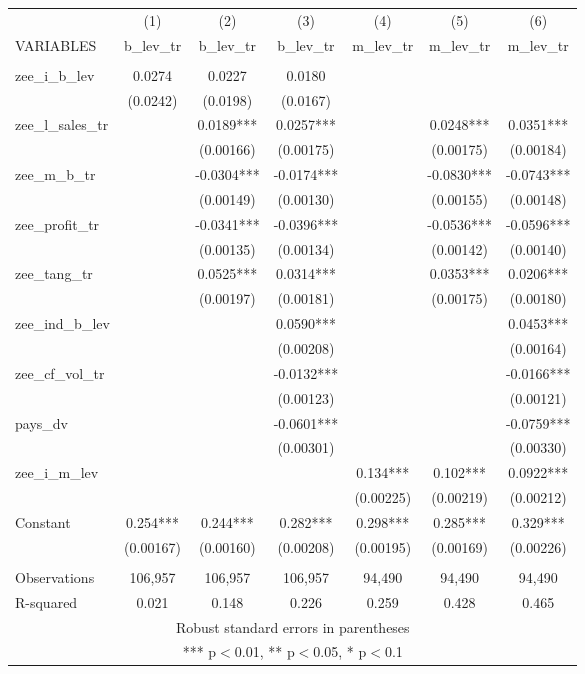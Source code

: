 \begin{tabular}{lcccccc} \hline
 & (1) & (2) & (3) & (4) & (5) & (6) \\
VARIABLES & b\_lev\_tr & b\_lev\_tr & b\_lev\_tr & m\_lev\_tr & m\_lev\_tr & m\_lev\_tr \\ \hline
 &  &  &  &  &  &  \\
zee\_i\_b\_lev & 0.0274 & 0.0227 & 0.0180 &  &  &  \\
 & (0.0242) & (0.0198) & (0.0167) &  &  &  \\
zee\_l\_sales\_tr &  & 0.0189*** & 0.0257*** &  & 0.0248*** & 0.0351*** \\
 &  & (0.00166) & (0.00175) &  & (0.00175) & (0.00184) \\
zee\_m\_b\_tr &  & -0.0304*** & -0.0174*** &  & -0.0830*** & -0.0743*** \\
 &  & (0.00149) & (0.00130) &  & (0.00155) & (0.00148) \\
zee\_profit\_tr &  & -0.0341*** & -0.0396*** &  & -0.0536*** & -0.0596*** \\
 &  & (0.00135) & (0.00134) &  & (0.00142) & (0.00140) \\
zee\_tang\_tr &  & 0.0525*** & 0.0314*** &  & 0.0353*** & 0.0206*** \\
 &  & (0.00197) & (0.00181) &  & (0.00175) & (0.00180) \\
zee\_ind\_b\_lev &  &  & 0.0590*** &  &  & 0.0453*** \\
 &  &  & (0.00208) &  &  & (0.00164) \\
zee\_cf\_vol\_tr &  &  & -0.0132*** &  &  & -0.0166*** \\
 &  &  & (0.00123) &  &  & (0.00121) \\
pays\_dv &  &  & -0.0601*** &  &  & -0.0759*** \\
 &  &  & (0.00301) &  &  & (0.00330) \\
zee\_i\_m\_lev &  &  &  & 0.134*** & 0.102*** & 0.0922*** \\
 &  &  &  & (0.00225) & (0.00219) & (0.00212) \\
Constant & 0.254*** & 0.244*** & 0.282*** & 0.298*** & 0.285*** & 0.329*** \\
 & (0.00167) & (0.00160) & (0.00208) & (0.00195) & (0.00169) & (0.00226) \\
 &  &  &  &  &  &  \\
Observations & 106,957 & 106,957 & 106,957 & 94,490 & 94,490 & 94,490 \\
 R-squared & 0.021 & 0.148 & 0.226 & 0.259 & 0.428 & 0.465 \\ \hline
\multicolumn{7}{c}{ Robust standard errors in parentheses} \\
\multicolumn{7}{c}{ *** p$<$0.01, ** p$<$0.05, * p$<$0.1} \\
\end{tabular}
